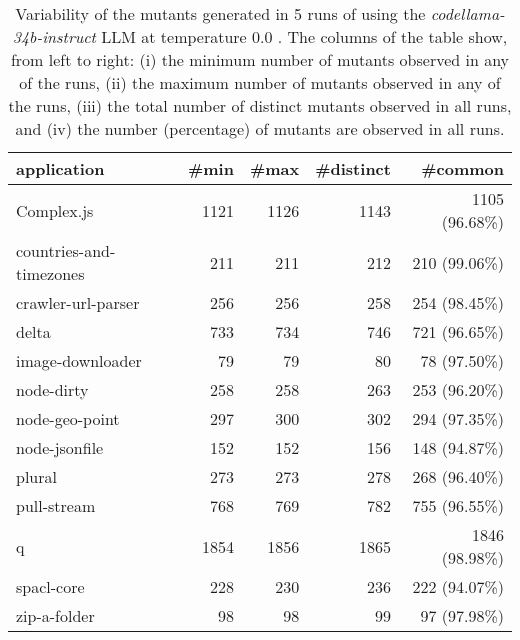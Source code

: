 
\begin{table}[hbt!]
\centering
{\footnotesize
\begin{tabular}{l|r|r|r|r}

{\bf application}  & {\bf \#min} &  {\bf \#max} &  {\bf \#distinct} & {\bf \#common}\\
\hline
Complex.js & 1121 & 1126 & 1143 & 1105 (96.68\%) \\ 
countries-and-timezones & 211 & 211 & 212 & 210 (99.06\%) \\ 
crawler-url-parser & 256 & 256 & 258 & 254 (98.45\%) \\ 
delta & 733 & 734 & 746 & 721 (96.65\%) \\ 
image-downloader & 79 & 79 & 80 & 78 (97.50\%) \\ 
node-dirty & 258 & 258 & 263 & 253 (96.20\%) \\ 
node-geo-point & 297 & 300 & 302 & 294 (97.35\%) \\ 
node-jsonfile & 152 & 152 & 156 & 148 (94.87\%) \\ 
plural & 273 & 273 & 278 & 268 (96.40\%) \\ 
pull-stream & 768 & 769 & 782 & 755 (96.55\%) \\ 
q & 1854 & 1856 & 1865 & 1846 (98.98\%) \\ 
spacl-core & 228 & 230 & 236 & 222 (94.07\%) \\ 
zip-a-folder & 98 & 98 & 99 & 97 (97.98\%) \\ 
\end{tabular}
}
\caption{
  Variability of the mutants generated in 5 runs of \ToolName using the \textit{codellama-34b-instruct} LLM
       at temperature 0.0 . The columns of the table show, from left to right:
    (i) the minimum number of mutants observed in any of the runs,
    (ii) the maximum number of mutants observed in any of the runs,
    (iii) the total number of distinct mutants observed in all runs, and
    (iv) the number (percentage) of mutants are observed in all runs.
}
\label{table:Variability_codellama-34b-instruct_0.0}
\end{table}